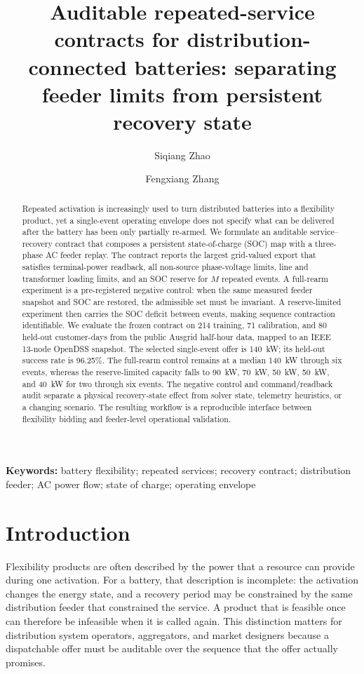\documentclass[11pt]{article}
\title{Auditable repeated-service contracts for distribution-connected batteries: separating feeder limits from persistent recovery state}
\author{Siqiang Zhao \and Fengxiang Zhang}
\date{}
\begin{document}
\maketitle

\begin{abstract}
Repeated activation is increasingly used to turn distributed batteries into a flexibility product, yet a single-event operating envelope does not specify what can be delivered after the battery has been only partially re-armed. We formulate an auditable service--recovery contract that composes a persistent state-of-charge (SOC) map with a three-phase AC feeder replay. The contract reports the largest grid-valued export that satisfies terminal-power readback, all non-source phase-voltage limits, line and transformer loading limits, and an SOC reserve for $M$ repeated events. A full-rearm experiment is a pre-registered negative control: when the same measured feeder snapshot and SOC are restored, the admissible set must be invariant. A reserve-limited experiment then carries the SOC deficit between events, making sequence contraction identifiable. We evaluate the frozen contract on 214 training, 71 calibration, and 80 held-out customer-days from the public Ausgrid half-hour data, mapped to an IEEE 13-node OpenDSS snapshot. The selected single-event offer is \SI{140}{kW}; its held-out success rate is 96.25\%. The full-rearm control remains at a median \SI{140}{kW} through six events, whereas the reserve-limited capacity falls to \SI{90}{kW}, \SI{70}{kW}, \SI{50}{kW}, \SI{50}{kW}, and \SI{40}{kW} for two through six events. The negative control and command/readback audit separate a physical recovery-state effect from solver state, telemetry heuristics, or a changing scenario. The resulting workflow is a reproducible interface between flexibility bidding and feeder-level operational validation.
\end{abstract}

\noindent\textbf{Keywords:} battery flexibility; repeated services; recovery contract; distribution feeder; AC power flow; state of charge; operating envelope

\section{Introduction}
Flexibility products are often described by the power that a resource can provide during one activation. For a battery, that description is incomplete: the activation changes the energy state, and a recovery period may be constrained by the same distribution feeder that constrained the service. A product that is feasible once can therefore be infeasible when it is called again. This distinction matters for distribution system operators, aggregators, and market designers because a dispatchable offer must be auditable over the sequence that the offer actually promises.
\end{document}
